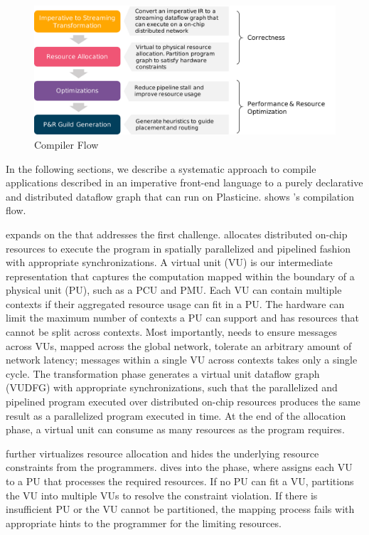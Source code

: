\begin{figure}
\centering
\includegraphics[width=1\textwidth]{figs/sarastack.pdf}
\caption[\name Compiler Flow]{\name Compiler Flow}
\label{fig:flow}
\end{figure}
 
In the following sections, we describe a systematic approach to compile applications described in an
imperative front-end language to a purely declarative and distributed dataflow graph that can
run on Plasticine.  shows \name's compilation flow.

 expands on the  that
addresses the first challenge.
\name allocates distributed on-chip resources to execute the program in spatially parallelized and
pipelined fashion with appropriate synchronizations.
A virtual unit (VU) is our intermediate representation that captures the computation mapped
within the boundary of a physical unit (PU), such as a PCU and PMU.
Each VU can contain multiple contexts if their aggregated resource usage can fit in a PU.
The hardware can limit the maximum number of contexts a PU can support and has resources that cannot be split across contexts.
Most importantly, \name needs to ensure messages across VUs, mapped across the global network,
tolerate an arbitrary amount of network latency; messages within a single VU across contexts takes only a single cycle.
The transformation phase generates a virtual unit dataflow graph (VUDFG) with appropriate
synchronizations, such that the parallelized and pipelined program executed over distributed on-chip resources produces the same result as a
parallelized program executed in time.
At the end of the allocation phase, a virtual unit can consume as many resources as the program
requires. 

\name further virtualizes resource allocation and hides the underlying resource constraints from the programmers.
 dives into the  phase, where \name assigns each VU to a
PU that processes the required resources. If no PU can fit a VU, \name partitions the
VU into multiple VUs to resolve the constraint violation. If there is insufficient PU or the VU cannot be partitioned, the mapping process fails with appropriate hints to the programmer for the
limiting resources.

